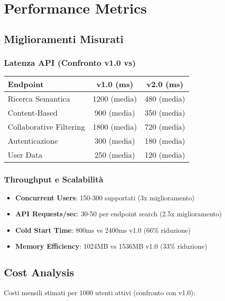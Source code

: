 \documentclass[11pt,a4paper]{article}
\begin{document}
\section{Performance Metrics}

\subsection{Miglioramenti Misurati}

\subsubsection{Latenza API (Confronto v1.0 vs)}
\begin{center}
\begin{tabular}{lcc}
\toprule
\textbf{Endpoint} & \textbf{v1.0 (ms)} & \textbf{v2.0 (ms)} \\
\midrule
Ricerca Semantica & 1200 (media) & 480 (media) \\
Content-Based & 900 (media) & 350 (media) \\
Collaborative Filtering & 1800 (media) & 720 (media) \\
Autenticazione & 300 (media) & 180 (media) \\
User Data & 250 (media) & 120 (media) \\
\bottomrule
\end{tabular}
\end{center}

\subsubsection{Throughput e Scalabilità}
\begin{itemize}
  \item \textbf{Concurrent Users}: 150-300 supportati (3x miglioramento)
  \item \textbf{API Requests/sec}: 30-50 per endpoint search (2.5x miglioramento)
  \item \textbf{Cold Start Time}: 800ms vs 2400ms v1.0 (66\% riduzione)
  \item \textbf{Memory Efficiency}: 1024MB vs 1536MB v1.0 (33\% riduzione)
\end{itemize}

\subsection{Cost Analysis}
Costi mensili stimati per 1000 utenti attivi (confronto con v1.0):
\end{document}
